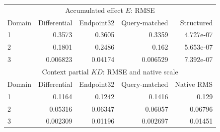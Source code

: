 \begin{tabular}{lrrrr}
\toprule
\multicolumn{5}{c}{Accumulated effect $E$: RMSE}\\
Domain & Differential & Endpoint32 & Query-matched & Structured\\
\midrule
1 & 0.3573 & 0.3605 & 0.3359 & 4.727e-07 \\
2 & 0.1801 & 0.2486 & 0.162 & 5.653e-07 \\
3 & 0.006823 & 0.04174 & 0.006529 & 7.392e-07 \\
\midrule
\multicolumn{5}{c}{Context partial $KD$: RMSE and native scale}\\
Domain & Differential & Endpoint32 & Query-matched & Native RMS\\
\midrule
1 & 0.1164 & 0.1242 & 0.1416 & 0.129 \\
2 & 0.05316 & 0.06347 & 0.06057 & 0.06796 \\
3 & 0.002309 & 0.01196 & 0.002697 & 0.01451 \\
\bottomrule
\end{tabular}
